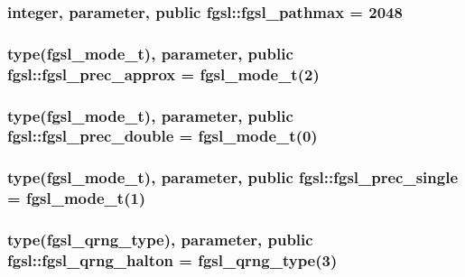 \hypertarget{classfgsl_a4531e537443b76eab7842214d4e86f01}{
\subsubsection[{fgsl\-\_\-pathmax}]{\setlength{\rightskip}{0pt plus 5cm}integer, parameter, public fgsl\-::fgsl\-\_\-pathmax = 2048}}\label{classfgsl_a4531e537443b76eab7842214d4e86f01}
\hypertarget{classfgsl_ab6d5bd94526f9dacea9ce2293a66c824}{
\subsubsection[{fgsl\-\_\-prec\-\_\-approx}]{\setlength{\rightskip}{0pt plus 5cm}type({\bf fgsl\-\_\-mode\-\_\-t}), parameter, public fgsl\-::fgsl\-\_\-prec\-\_\-approx = {\bf fgsl\-\_\-mode\-\_\-t}(2)}}\label{classfgsl_ab6d5bd94526f9dacea9ce2293a66c824}
\hypertarget{classfgsl_a974fb113c1c5dced8257e1eae0def683}{
\subsubsection[{fgsl\-\_\-prec\-\_\-double}]{\setlength{\rightskip}{0pt plus 5cm}type({\bf fgsl\-\_\-mode\-\_\-t}), parameter, public fgsl\-::fgsl\-\_\-prec\-\_\-double = {\bf fgsl\-\_\-mode\-\_\-t}(0)}}\label{classfgsl_a974fb113c1c5dced8257e1eae0def683}
\hypertarget{classfgsl_ac6801c472f4316aa060668c157db61bd}{
\subsubsection[{fgsl\-\_\-prec\-\_\-single}]{\setlength{\rightskip}{0pt plus 5cm}type({\bf fgsl\-\_\-mode\-\_\-t}), parameter, public fgsl\-::fgsl\-\_\-prec\-\_\-single = {\bf fgsl\-\_\-mode\-\_\-t}(1)}}\label{classfgsl_ac6801c472f4316aa060668c157db61bd}
\hypertarget{classfgsl_a0d865a8d73c002f671f6e1bc1727966c}{
\subsubsection[{fgsl\-\_\-qrng\-\_\-halton}]{\setlength{\rightskip}{0pt plus 5cm}type({\bf fgsl\-\_\-qrng\-\_\-type}), parameter, public fgsl\-::fgsl\-\_\-qrng\-\_\-halton = {\bf fgsl\-\_\-qrng\-\_\-type}(3)}}\label{classfgsl_a0d865a8d73c002f671f6e1bc1727966c}
